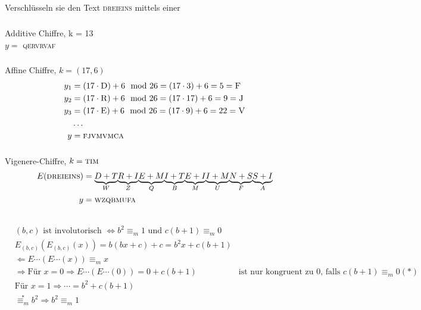 \documentclass[main.tex]{subfiles}
\begin{document}
\subsection{}
Verschlüsseln sie den Text \textsc{dreieins} mittels einer
\subsubsection{} %
Additive Chiffre, k = 13\\
$ y = $ \textsc{qervrvaf}
\subsubsection{}
Affine Chiffre, $k = (17,6)$ \\
\begin{align*}
  y_1 &= (17\cdot \textsc{D})+6 \mod 26  = (17\cdot 3)+6 = 5 = \textsc{F} \\
  y_2 &= (17\cdot \textsc{R})+6 \mod 26  = (17\cdot 17)+6 = 9 = \textsc{J} \\
  y_3 &= (17\cdot \textsc{E})+6 \mod 26  = (17\cdot 9)+6  = 22 = \textsc {V} \\
  &\ldots \\
  y &= \textsc{fjvmvmca}
\end{align*}

\subsubsection{}
Vigenere-Chiffre, $k = \textsc{tim}$ \\
\begin{align*}
  E(\textsc{dreieins}) &= \underset{W}{\underbrace{D+T}} \underset{Z}{\underbrace{R+I}} \underset{Q}{\underbrace{E+M}} \underset{B}{\underbrace{I+T}} \underset{M}{\underbrace{E+I}} \underset{U}{\underbrace{I+M}} \underset{F}{\underbrace{N+S}} \underset{A}{\underbrace{S+I}}\\
  y &= \textsc{wzqbmufa}
\end{align*}

\subsection{}
\subsubsection{}
\begin{align*}
&(b,c) \text{ ist involutorisch } \Leftrightarrow  b^2 \equiv_m 1 \text{ und } c(b+1) \equiv_m 0\\
&E_{(b,c)}(E_{(b,c)}(x)) =  b(bx + c) + c = b^2x + c(b+1)\\
&\Leftarrow  E\cdots(E\cdots(x)) \equiv_m  x\\
&\Rightarrow \text{Für } x = 0 \Rightarrow  E\cdots(E\cdots (0)) = 0 + c(b+1) &\text{ist nur kongruent zu 0, falls } c(b+1)\equiv_m 0 (\ast)\\
&\text{Für } x=1 \Rightarrow  \cdots = b^2 + c(b+1)\\
&\overset{\ast}{\equiv_m} b^2 \Rightarrow b^2 \equiv_m 1\\
\end{align*}
\end{document}
